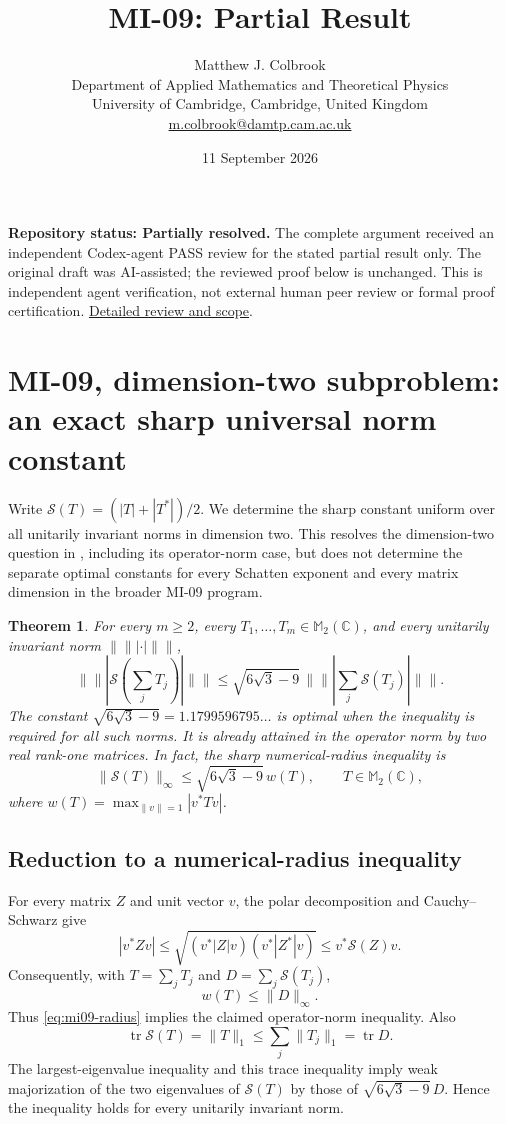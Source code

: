 \documentclass[10pt,a4paper]{article}
\title{MI-09: Partial Result}
\author{Matthew J. Colbrook\\
\small Department of Applied Mathematics and Theoretical Physics\\
\small University of Cambridge, Cambridge, United Kingdom\\
\small\href{mailto:m.colbrook@damtp.cam.ac.uk}{m.colbrook@damtp.cam.ac.uk}}
\date{11 September 2026}
\newtheorem{theorem}{Theorem}[section]
\theoremstyle{remark}
\newcommand{\M}{\mathbb M}
\newcommand{\C}{\mathbb C}
\newcommand{\tr}{\operatorname{tr}}
\newcommand{\opnorm}[1]{\lVert #1\rVert_{\infty}}
\newcommand{\symmod}{\mathcal S}
\begin{document}
\maketitle
\textbf{Repository status: Partially resolved.}
The complete argument received an independent Codex-agent PASS review
for the stated partial result only.
The original draft was AI-assisted; the reviewed proof below is unchanged.
This is independent agent verification, not external human peer review or
formal proof certification. \href{https://github.com/ajt60gaibb/OpenProblemsInNLA/blob/main/references/colbrook-matrix-2026-09-11/verification/reviews/MI-09-review.md}{Detailed review and scope}.
\par\medskip
\section{MI-09, dimension-two subproblem: an exact sharp universal norm constant}
\label{sec:mi09}
Write $\symmod(T)=(|T|+|T^*|)/2$. We determine the sharp constant uniform over all unitarily invariant norms in dimension two. This resolves the dimension-two question in \cite[Problem 1.11]{Zhang2026}, including its operator-norm case, but does not determine the separate optimal constants for every Schatten exponent and every matrix dimension in the broader MI-09 program.

\begin{theorem}\label{thm:mi09}
For every $m\geq2$, every $T_1,\ldots,T_m\in\M_2(\C)$, and every unitarily invariant norm $\|\!\|\!|\cdot|\!\|\!\|$,
\[
 \|\!\|\!|\symmod(\textstyle\sum_jT_j)|\!\|\!\|
 \leq \sqrt{6\sqrt3-9}\,
 \|\!\|\!|\textstyle\sum_j\symmod(T_j)|\!\|\!\|.
\]
The constant $\sqrt{6\sqrt3-9}=1.1799596795\ldots$ is optimal when the inequality is required for all such norms. It is already attained in the operator norm by two real rank-one matrices. In fact, the sharp numerical-radius inequality is
\begin{equation}\label{eq:mi09-radius}
 \opnorm{\symmod(T)}\leq\sqrt{6\sqrt3-9}\,w(T),\qquad T\in\M_2(\C),
\end{equation}
where $w(T)=\max_{\|v\|=1}|v^*Tv|$.
\end{theorem}

\subsection{Reduction to a numerical-radius inequality}
For every matrix $Z$ and unit vector $v$, the polar decomposition and Cauchy--Schwarz give
\[
 |v^*Zv|\leq\sqrt{(v^*|Z|v)(v^*|Z^*|v)}\leq v^*\symmod(Z)v.
\]
Consequently, with $T=\sum_jT_j$ and $D=\sum_j\symmod(T_j)$,
\[
 w(T)\leq\opnorm{D}.
\]
Thus \eqref{eq:mi09-radius} implies the claimed operator-norm inequality. Also
\[
 \tr\symmod(T)=\|T\|_1\leq\sum_j\|T_j\|_1=\tr D.
\]
The largest-eigenvalue inequality and this trace inequality imply weak majorization of the two eigenvalues of $\symmod(T)$ by those of $\sqrt{6\sqrt3-9}\,D$. Hence the inequality holds for every unitarily invariant norm.
\end{document}
